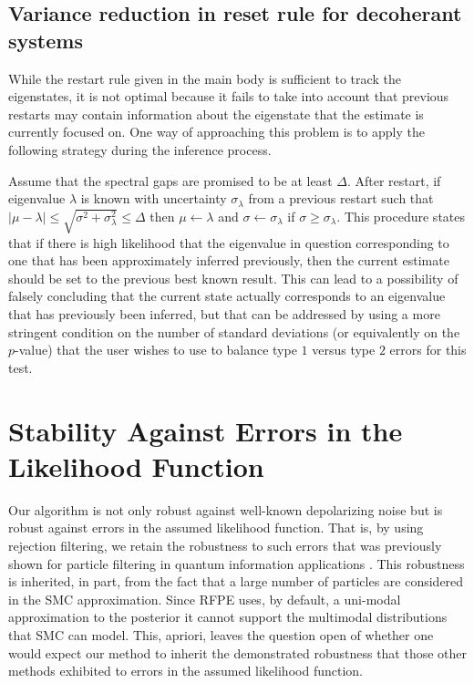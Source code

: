 \documentclass[aps,pra,amsmath,twocolumn,amssymb,superscriptaddress]{revtex4-1}
\begin{document}
\subsection{Variance reduction in reset rule for decoherant systems}
While the restart rule given in the main body is sufficient to track the eigenstates, it is not optimal because it fails to take into account that previous restarts may contain information about the eigenstate that the estimate is currently focused on.  One way of approaching this problem is to apply the following strategy during the inference process.  

Assume that the spectral gaps are promised to be at least $\Delta$.
After restart, if eigenvalue $\lambda$ is known with uncertainty $\sigma_\lambda$ from a previous restart such that $|\mu-\lambda| \le \sqrt{\sigma^2 + \sigma_\lambda^2}\le \Delta$ then $\mu\gets \lambda$ and $\sigma\gets \sigma_\lambda$ if $\sigma \ge \sigma_\lambda$.  This procedure states that if there is high likelihood that the eigenvalue in question corresponding to one that has been approximately inferred previously, then the current estimate should be set to the previous best known result.  This can lead to a possibility of falsely concluding that the current state actually corresponds to an eigenvalue that has previously been inferred, but that can be addressed by using a more stringent condition on the number of standard deviations (or equivalently on the $p$-value) that the user wishes to use to balance type $1$ versus type $2$ errors for this test.


\section{Stability Against Errors in the Likelihood Function}


Our algorithm is not only robust against well-known depolarizing noise but is robust against errors in the assumed likelihood function.
That is, by using rejection filtering, we retain the robustness to such errors that was previously shown for particle filtering
in quantum information applications \cite{ferrie_likelihood-free_2014,wiebe_quantum_2014-1,stenberg_efficient_2014}.  This robustness is inherited, in part, from the fact that a large number of particles are considered in the SMC approximation.  Since RFPE uses, by default, a uni-modal approximation to the posterior it cannot support the multimodal distributions that SMC can model.  This, apriori, leaves the question open of whether one would expect our method to inherit the demonstrated robustness that those other methods exhibited to errors in the assumed likelihood function.
\end{document}
